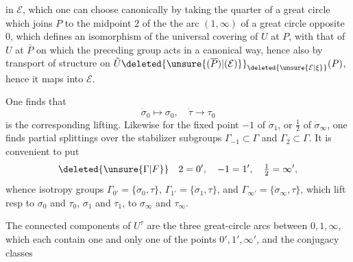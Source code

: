 in $\mathcal E$, which one can choose canonically by taking the quarter of a great circle which joins $P$ to the midpoint $2$ of the  the arc $(1,\infty)$ of a great circle opposite $0$, which defines an isomorphism of the universal covering of $U$ at $P$, with that of $U$ at $\bar P$ on which the preceding group acts in a canonical way, hence also by transport of structure on $\tilde U\deleted{\unsure{(\overline P)|(\mathcal E)}}_{\deleted{\unsure{\mathcal E|\xi}}}(P)$, hence it maps into $\mathcal E$.

One finds that
\[
\dot\sigma_0\mapsto\sigma_0,\quad\dot\tau\to\tau_0
\]
is the corresponding lifting. Likewise for the fixed point $-1$ of $\dot\sigma_1$, or $\frac12$ of $\dot\sigma_\infty$, one finds partial splittings over the  stabilizer subgroups $\Gamma_{-1}\subset\Gamma$ and $\Gamma_2\subset\Gamma$. It is convenient to put
\[
\deleted{\unsure{\Gamma|F}}\quad 2=0',\quad -1=1',\quad \tfrac12=\infty',
\]
whence isotropy groups $\Gamma_{0'}=\{\dot\sigma_0,\tau\}$, $\Gamma_{1'}=\{\dot\sigma_1,\tau\}$, and $\Gamma_{\infty'}=\{\dot\sigma_\infty,\tau\}$, which lift resp to $\sigma_0$ and $\tau_0$,  $\sigma_1$ and $\tau_1$, to $\sigma_\infty$ and $\tau_\infty$.

The connected components of $U^\tau$ are the three great-circle arcs between $0,1,\infty$, which each contain one  and only one of the points $0',1',\infty'$, and the conjugacy classes
